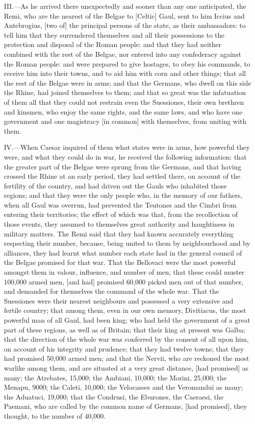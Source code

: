 III.—As he arrived there unexpectedly and sooner than any one
anticipated, the Remi, who are the nearest of the Belgae to [Celtic]
Gaul, sent to him Iccius and Antebrogius, [two of] the principal persons
of the state, as their ambassadors: to tell him that they surrendered
themselves and all their possessions to the protection and disposal of
the Roman people: and that they had neither combined with the rest of
the Belgae, nor entered into any confederacy against the Roman people:
and were prepared to give hostages, to obey his commands, to receive him
into their towns, and to aid him with corn and other things; that all
the rest of the Belgae were in arms; and that the Germans, who dwell on
this side the Rhine, had joined themselves to them; and that so great
was the infatuation of them all that they could not restrain even the
Suessiones, their own brethren and kinsmen, who enjoy the same rights,
and the same laws, and who have one government and one magistracy [in
common] with themselves, from uniting with them.

IV.—When Caesar inquired of them what states were in arms, how powerful
they were, and what they could do in war, he received the following
information: that the greater part of the Belgae were sprung from the
Germans, and that having crossed the Rhine at an early period, they had
settled there, on account of the fertility of the country, and had
driven out the Gauls who inhabited those regions; and that they were the
only people who, in the memory of our fathers, when all Gaul was
overrun, had prevented the Teutones and the Cimbri from entering their
territories; the effect of which was that, from the recollection of
those events, they assumed to themselves great authority and haughtiness
in military matters. The Remi said that they had known accurately
everything respecting their number, because, being united to them by
neighbourhood and by alliances, they had learnt what number each state
had in the general council of the Belgae promised for that war. That the
Bellovaci were the most powerful amongst them in valour, influence, and
number of men; that these could muster 100,000 armed men, [and had]
promised 60,000 picked men out of that number, and demanded for
themselves the command of the whole war. That the Suessiones were their
nearest neighbours and possessed a very extensive and fertile country;
that among them, even in our own memory, Divitiacus, the most powerful
man of all Gaul, had been king; who had held the government of a great
part of these regions, as well as of Britain; that their king at present
was Galba; that the direction of the whole war was conferred by the
consent of all upon him, on account of his integrity and prudence; that
they had twelve towns; that they had promised 50,000 armed men; and that
the Nervii, who are reckoned the most warlike among them, and are
situated at a very great distance, [had promised] as many; the
Atrebates, 15,000; the Ambiani, 10,000; the Morini, 25,000; the Menapu,
9000; the Caleti, 10,000; the Velocasses and the Veromandui as many; the
Aduatuci, 19,000; that the Condrusi, the Eburones, the Caeraesi, the
Paemani, who are called by the common name of Germans, [had promised],
they thought, to the number of 40,000.

